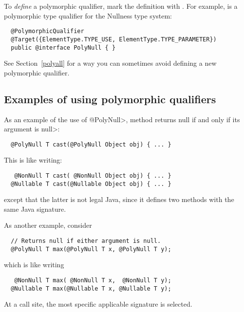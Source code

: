 To \emph{define} a polymorphic qualifier, mark the definition with
.  For example,
 is a polymorphic type
qualifier for the Nullness type system:

\begin{Verbatim}
  @PolymorphicQualifier
  @Target({ElementType.TYPE_USE, ElementType.TYPE_PARAMETER})
  public @interface PolyNull { }
\end{Verbatim}

\noindent
See Section~\ref{polyall} for a way you can sometimes avoid defining a new
polymorphic qualifier.


\subsection{Examples of using polymorphic qualifiers\label{qualifier-polymorphism-examples}}

As an example of the use of \<@PolyNull>, method
returns null if and only if its argument is \<null>:

\begin{Verbatim}
  @PolyNull T cast(@PolyNull Object obj) { ... }
\end{Verbatim}

\noindent
This is like writing:

\begin{Verbatim}
   @NonNull T cast( @NonNull Object obj) { ... }
  @Nullable T cast(@Nullable Object obj) { ... }
\end{Verbatim}

\noindent
except that the latter is not legal Java, since it defines two
methods with the same Java signature.


As another example, consider

\begin{Verbatim}
  // Returns null if either argument is null.
  @PolyNull T max(@PolyNull T x, @PolyNull T y);
\end{Verbatim}

\noindent
which is like writing

\begin{Verbatim}
   @NonNull T max( @NonNull T x,  @NonNull T y);
  @Nullable T max(@Nullable T x, @Nullable T y);
\end{Verbatim}

\noindent
At a call site, the most specific applicable signature is selected.

